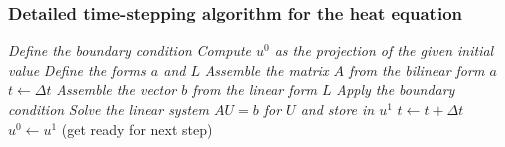 \begin{frame}
  \frametitle{Detailed time-stepping algorithm for the heat equation}


  \begin{algorithmic}
    \STATE \emph{Define the boundary condition}
    \STATE \emph{Compute $u^0$ as the projection of the given initial value}
    \STATE \emph{Define the forms $a$ and $L$}
    \STATE \emph{Assemble the matrix $A$ from the bilinear form $a$}
    \STATE $t \gets \Delta t$
      \STATE \emph{Assemble the vector $b$ from the linear form $L$}
      \STATE \emph{Apply the boundary condition}
      \STATE \emph{Solve the linear system $AU=b$ for $U$ and store in $u^1$}
      \STATE $t \gets t + \Delta t$
      \STATE $u^0 \gets u^1$ (get ready for next step)
    \ENDWHILE
  \end{algorithmic}

\end{frame}
